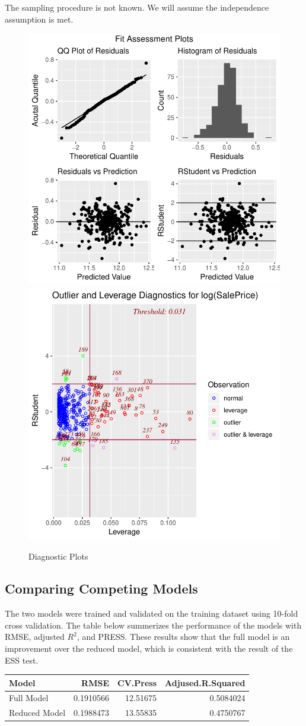 \documentclass[american,]{article}
\begin{document}
The sampling procedure is not known. We will assume the independence
assumption is met.

\begin{figure}[htbp]

{\centering \includegraphics[width=0.45\linewidth]{HousePriceRegressionAnalysis_files/figure-latex/diag-plots-1} \includegraphics[width=0.45\linewidth]{HousePriceRegressionAnalysis_files/figure-latex/diag-plots-2} 

}

\caption{Diagnostic Plots}\label{fig:diag-plots}
\end{figure}

\hypertarget{comparing-competing-models}{%
\subsection{Comparing Competing
Models}\label{comparing-competing-models}}

The two models were trained and validated on the training dataset using
10-fold cross validation. The table below summerizes the performance of
the models with RMSE, adjusted \(R^2\), and PRESS. These results show
that the full model is an improvement over the reduced model, which is
consistent with the result of the ESS test.

\begin{table}[H]
\centering
\begin{tabular}{lrrr}
\toprule
Model & RMSE & CV.Press & Adjused.R.Squared\\
\midrule
Full Model & 0.1910566 & 12.51675 & 0.5084024\\
Reduced Model & 0.1988473 & 13.55835 & 0.4750767\\
\bottomrule
\end{tabular}
\end{table}
\end{document}
